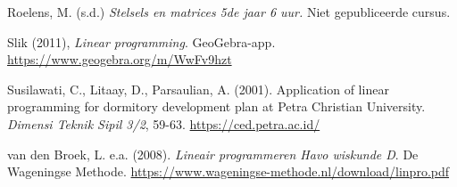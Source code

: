 \begin{bronnen}
	\item Roelens, M. (s.d.) \emph{Stelsels en matrices 5de jaar 6 uur.} Niet gepubliceerde cursus.
	
    \item Slik (2011), \emph{Linear programming}. GeoGebra-app. \url{https://www.geogebra.org/m/WwFv9hzt}

	\item Susilawati, C., Litaay, D., Parsaulian, A. (2001). Application of linear programming for dormitory development plan at Petra Christian University. \emph{Dimensi Teknik Sipil 3/2}, 59-63. \url{https://ced.petra.ac.id/}
	
    \item van den Broek, L. e.a. (2008). \emph{Lineair programmeren Havo wiskunde D}. De Wageningse Methode. \url{https://www.wageningse-methode.nl/download/linpro.pdf}
	
\end{bronnen}

